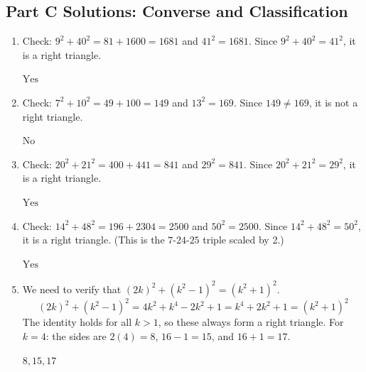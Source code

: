\documentclass[14pt]{extarticle}
\begin{document}
\subsection*{Part C Solutions: Converse and Classification}
\begin{enumerate}
  \item Check: \(9^2 + 40^2 = 81 + 1600 = 1681\) and \(41^2 = 1681\). Since \(9^2 + 40^2 = 41^2\), it is a right triangle.

  \(\boxed{\text{Yes}}\)

  \item Check: \(7^2 + 10^2 = 49 + 100 = 149\) and \(13^2 = 169\). Since \(149 \neq 169\), it is not a right triangle.

  \(\boxed{\text{No}}\)

  \item Check: \(20^2 + 21^2 = 400 + 441 = 841\) and \(29^2 = 841\). Since \(20^2 + 21^2 = 29^2\), it is a right triangle.

  \(\boxed{\text{Yes}}\)

  \item Check: \(14^2 + 48^2 = 196 + 2304 = 2500\) and \(50^2 = 2500\). Since \(14^2 + 48^2 = 50^2\), it is a right triangle. (This is the \(7\text{-}24\text{-}25\) triple scaled by 2.)

  \(\boxed{\text{Yes}}\)

  \item We need to verify that \((2k)^2 + (k^2 - 1)^2 = (k^2 + 1)^2\).
  \[
  (2k)^2 + (k^2 - 1)^2 = 4k^2 + k^4 - 2k^2 + 1 = k^4 + 2k^2 + 1 = (k^2 + 1)^2
  \]
  The identity holds for all \(k > 1\), so these always form a right triangle. For \(k = 4\): the sides are \(2(4) = 8\), \(16 - 1 = 15\), and \(16 + 1 = 17\).

  \(\boxed{8, 15, 17}\)
\end{enumerate}
\end{document}
